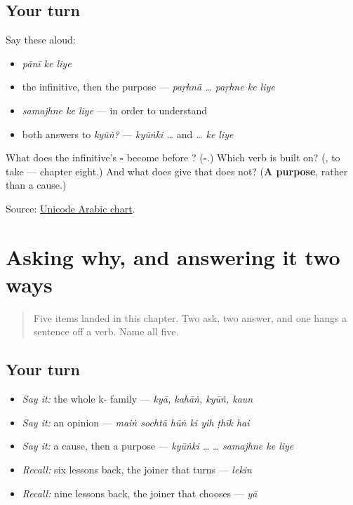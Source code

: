 \subsection*{Your turn}
Say these aloud:

\begin{itemize}
\raggedright
  \item \emph{pānī ke liye}
  \item the infinitive, then the purpose — \emph{paṛhnā … paṛhne ke liye}
  \item \emph{samajhne ke liye} — in order to understand
  \item both answers to \emph{kyūṅ?} — \emph{kyūṅki …} and \emph{… ke liye}
\end{itemize}

\begin{tcolorbox}[breakable,colback=teal!4,colframe=teal!35!black,title={Before you move on}]
What does the infinitive's \textbf{-} become before \textbf{ }? (\textbf{-}.) Which verb is \textbf{} built on? (\textbf{}, to take — chapter eight.) And what does \textbf{ } give that \textbf{} does not? (\textbf{A purpose}, rather than a cause.)

Source: \href{https://www.unicode.org/charts/PDF/U0600.pdf}{Unicode Arabic chart}.
\end{tcolorbox}
\section[\texorpdfstring{\ur{کیوں} · \ur{کیونکہ} · \ur{کہ} (kyūṅ · kyūṅki · ki)}{کیوں · کیونکہ · کہ (kyūṅ · kyūṅki · ki)}]{Asking why, and answering it two ways}

\label{lesson:UR-R21-why-and-what-for}



\begin{quote}
Five items landed in this chapter. Two ask, two answer, and one hangs a sentence off a verb. Name all five.
\end{quote}

\subsection*{Your turn}
\begin{itemize}
\raggedright
  \item \emph{Say it:} the whole k- family — \emph{kyā, kahāṅ, kyūṅ, kaun}
  \item \emph{Say it:} an opinion — \emph{maiṅ sochtā hūṅ ki yih ṭhīk hai}
  \item \emph{Say it:} a cause, then a purpose — \emph{kyūṅki …} … \emph{samajhne ke liye}
  \item \emph{Recall:} six lessons back, the joiner that turns — \emph{lekin}
  \item \emph{Recall:} nine lessons back, the joiner that chooses — \emph{yā}
\end{itemize}

